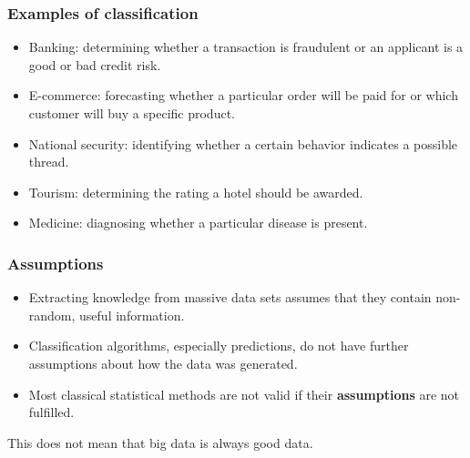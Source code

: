\documentclass{beamer}
\begin{document}

\begin{frame}
	\frametitle{Examples of classification}
	
	\begin{itemize}
		\item Banking: determining whether a transaction is fraudulent or an 
		applicant is a good or bad credit risk.
			\vspace{0.2cm}
		\item E-commerce: forecasting whether a particular order will be paid 
		for or which customer will buy a specific product.
			\vspace{0.2cm}
		\item National security: identifying whether a certain behavior 
		indicates a possible thread.
			\vspace{0.2cm}
		\item Tourism: determining the rating a hotel should be awarded.
			\vspace{0.2cm}
		\item Medicine: diagnosing whether a particular disease is present.
		
		\vspace{0.3cm}
		
	\end{itemize}
\end{frame}


\begin{frame}
	\frametitle{Assumptions}
	

	\begin{itemize}
		\item Extracting knowledge from massive data sets assumes that they contain non-random, useful information.
			\vspace{0.2cm}
		\item Classification algorithms, especially predictions, do not have further assumptions about how the data was generated.
			\vspace{0.2cm}
		\item Most classical statistical methods are not valid if their \textbf{assumptions} are not fulfilled.
	\end{itemize}
	\vspace{0.8cm}
	This does not mean that big data is always good data.
	
\end{frame}
\end{document}
